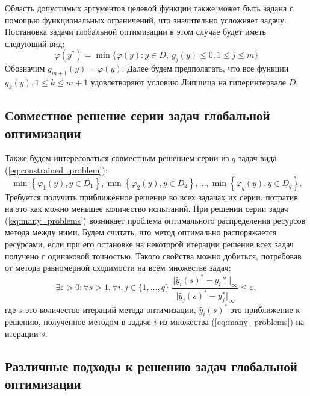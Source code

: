 Область допустимых аргументов целевой функции также может быть задана с помощью функциональных ограничений, что
значительно усложняет задачу.
Постановка задачи глобальной оптимизации в этом случае будет иметь следующий вид:
\begin{equation}
  \label{eq:constrained_problem}
  \varphi(y^*)=\min\{\varphi(y):y\in D,\: g_j(y)\leqslant 0, 1\leqslant j\leqslant m\}
\end{equation}
Обозначим \(g_{m+1}(y)=\varphi(y)\). Далее будем предполагать, что все функции \(g_k(y),1\leqslant k \leqslant m+1\)
удовлетворяют условию Липшица на гиперинтервале \(D\).

\subsection{Совместное решение серии задач глобальной оптимизации}

Также будем интересоваться совместным решением серии из \(q\) задач вида (\ref{eq:constrained_problem}):
\begin{equation}
  \label{eq:many_problems}
  \min\left\{\varphi_1(y), y\in D_1 \right\}, \min\left\{\varphi_2(y), y\in D_2\right\},..., \min\left\{\varphi_q(y), y\in D_q\right\}.
\end{equation}
Требуется получить приближённое решение во всех задачах их серии, потратив на это как можно меньшее количество испытаний.
При решении серии задач (\ref{eq:many_problems}) возникает проблема оптимального распределения ресурсов метода между ними.
Будем считать, что метод оптимально распоряжается ресурсами, если при его остановке на некоторой итерации
решение всех задач получено с одинаковой точностью. Такого свойства можно добиться, потребовав
от метода равномерной сходимости на всём множестве задач:
\begin{equation}
  \label{eq:uni_conv}
  \exists \varepsilon > 0: \forall s>1, \forall i,j\in\{1,\dots,q\}\;
    \frac{\Vert \tilde{y_i}(s)^* - y_i*\Vert_\infty}{\Vert \tilde{y_j}(s)^* - y^*_j\Vert_	\infty} \leqslant \varepsilon,
\end{equation}
где \(s\) это количество итераций метода оптимизации, \(\tilde{y_i}(s)^*\) это приближение к решению, полученное методом в задаче \(i\)
из множества (\ref{eq:many_problems}) на итерации \(s\).

\subsection{Различные подходы к решению задач глобальной оптимизации}

